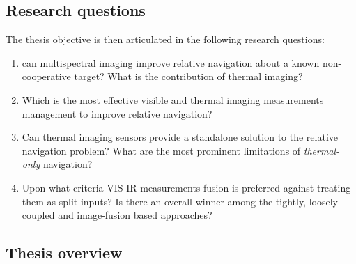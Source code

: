\subsection{Research questions}
The thesis objective is then articulated in the following research questions:

\begin{enumerate}
    \item can multispectral imaging improve relative navigation about a known non-cooperative target? What is the contribution of thermal imaging?
    \item Which is the most effective visible and thermal imaging measurements management to improve relative navigation?
    \item Can thermal imaging sensors provide a standalone solution to the relative navigation problem? What are the most prominent limitations of \textit{thermal-only} navigation?
    \item Upon what criteria VIS-IR measurements fusion is preferred against treating them as split inputs?
    Is there an overall winner among the tightly, loosely coupled and image-fusion based approaches?
    
\end{enumerate}


\subsection{Thesis overview}

